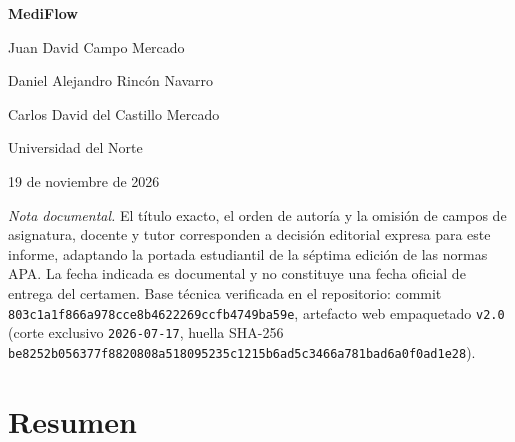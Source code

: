 
\thispagestyle{fancy}
\begingroup
\centering
\vspace*{2.5\baselineskip}

{\bfseries MediFlow}\par
\vspace{1.5\baselineskip}

Juan David Campo Mercado\par
Daniel Alejandro Rincón Navarro\par
Carlos David del Castillo Mercado\par
\vspace{0.5\baselineskip}
Universidad del Norte\par
19 de noviembre de 2026\par
\endgroup

\vfill
\begin{flushleft}
{\singlespacing\footnotesize\RaggedRight
\textit{Nota documental.} El título exacto, el orden de autoría y la omisión de campos de asignatura, docente y tutor corresponden a decisión editorial expresa para este informe, adaptando la portada estudiantil de la séptima edición de las normas APA. La fecha indicada es documental y no constituye una fecha oficial de entrega del certamen. Base técnica verificada en el repositorio: commit \nolinkurl{803c1a1f866a978cce8b4622269ccfb4749ba59e}, artefacto web empaquetado \texttt{v2.0} (corte exclusivo \texttt{2026-07-17}, huella SHA-256 \nolinkurl{be8252b056377f8820808a518095235c1215b6ad5c3466a781bad6a0f0ad1e28}).\par}
\end{flushleft}
\clearpage

\section{Resumen}

